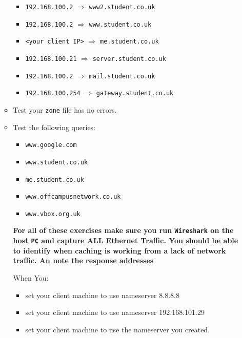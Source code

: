 \documentclass[11pt]{article}
\begin{document}
\begin{enumerate}
\begin{itemize}
                \begin{itemize}
                    \item \texttt{192.168.100.2} $\Rightarrow$ \texttt{www2.student.co.uk}
                    \item \texttt{192.168.100.2} $\Rightarrow$ \texttt{www.student.co.uk}
                    \item \texttt{<your client IP>} $\Rightarrow$ \texttt{me.student.co.uk}
                    \item \texttt{192.168.100.21} $\Rightarrow$ \texttt{server.student.co.uk}
                    \item \texttt{192.168.100.2} $\Rightarrow$ \texttt{mail.student.co.uk}
                    \item \texttt{192.168.100.254} $\Rightarrow$ \texttt{gateway.student.co.uk}
                \end{itemize}
            \item Test your \texttt{zone} file has no errors.
            \item Test the following queries:
                \begin{itemize}
                    \item \texttt{www.google.com}
                    \item \texttt{www.student.co.uk}
                    \item \texttt{me.student.co.uk}
                    \item \texttt{www.offcampusnetwork.co.uk}
                    \item \texttt{www.vbox.org.uk}
                \end{itemize}
                \begin{tcolorbox}[colback=blue!20]
                    \noindent\textbf{For all of these exercises make sure you run \texttt{Wireshark} on the host \texttt{PC} and capture ALL Ethernet Traffic. You should be able to identify when caching is working from a lack of network traffic. An note the response addresses}
                \end{tcolorbox}
                When You:
                \begin{itemize}
                    \item set your client machine to use nameserver 8.8.8.8
                    \item set your client machine to use nameserver 192.168.101.29
                    \item set your client machine to use the nameserver you created.

\end{itemize}
\end{itemize}
\end{enumerate}
\end{document}

